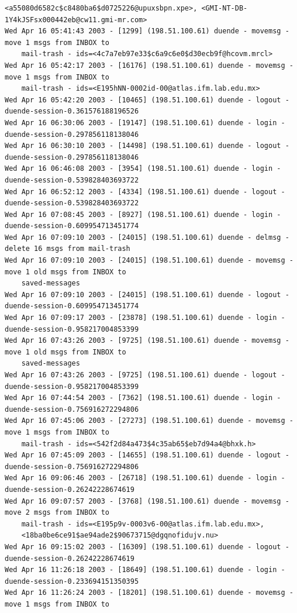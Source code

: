 \begin{lstlisting}[style=terminal]
    <a55080d6582c$c8480ba6$d0725226@upuxsbpn.xpe>, <GMI-NT-DB-1Y4kJSFsx000442eb@cw11.gmi-mr.com>
Wed Apr 16 05:41:43 2003 - [1299] (198.51.100.61) duende - movemsg - move 1 msgs from INBOX to 
    mail-trash - ids=<4c7a7eb97e33$c6a9c6e0$d30ecb9f@hcovm.mrcl>
Wed Apr 16 05:42:17 2003 - [16176] (198.51.100.61) duende - movemsg - move 1 msgs from INBOX to 
    mail-trash - ids=<E195hNN-0002id-00@atlas.ifm.lab.edu.mx>
Wed Apr 16 05:42:20 2003 - [10465] (198.51.100.61) duende - logout - duende-session-0.361576188196526
Wed Apr 16 06:30:06 2003 - [19147] (198.51.100.61) duende - login - duende-session-0.297856118138046
Wed Apr 16 06:30:10 2003 - [14498] (198.51.100.61) duende - logout - duende-session-0.297856118138046
Wed Apr 16 06:46:08 2003 - [3954] (198.51.100.61) duende - login - duende-session-0.539828403693722
Wed Apr 16 06:52:12 2003 - [4334] (198.51.100.61) duende - logout - duende-session-0.539828403693722
Wed Apr 16 07:08:45 2003 - [8927] (198.51.100.61) duende - login - duende-session-0.609954713451774
Wed Apr 16 07:09:10 2003 - [24015] (198.51.100.61) duende - delmsg - delete 16 msgs from mail-trash
Wed Apr 16 07:09:10 2003 - [24015] (198.51.100.61) duende - movemsg - move 1 old msgs from INBOX to 
    saved-messages
Wed Apr 16 07:09:10 2003 - [24015] (198.51.100.61) duende - logout - duende-session-0.609954713451774
Wed Apr 16 07:09:17 2003 - [23878] (198.51.100.61) duende - login - duende-session-0.958217004853399
Wed Apr 16 07:43:26 2003 - [9725] (198.51.100.61) duende - movemsg - move 1 old msgs from INBOX to 
    saved-messages
Wed Apr 16 07:43:26 2003 - [9725] (198.51.100.61) duende - logout - duende-session-0.958217004853399
Wed Apr 16 07:44:54 2003 - [7362] (198.51.100.61) duende - login - duende-session-0.756916272294806
Wed Apr 16 07:45:06 2003 - [27273] (198.51.100.61) duende - movemsg - move 1 msgs from INBOX to 
    mail-trash - ids=<542f2d84a473$4c35ab65$eb7d94a4@bhxk.h>
Wed Apr 16 07:45:09 2003 - [14655] (198.51.100.61) duende - logout - duende-session-0.756916272294806
Wed Apr 16 09:06:46 2003 - [26718] (198.51.100.61) duende - login - duende-session-0.26242228674619
Wed Apr 16 09:07:57 2003 - [3768] (198.51.100.61) duende - movemsg - move 2 msgs from INBOX to 
    mail-trash - ids=<E195p9v-0003v6-00@atlas.ifm.lab.edu.mx>, 
    <18ba0be6ce91$ae94ade2$90673715@dgqnofidujv.nu>
Wed Apr 16 09:15:02 2003 - [16309] (198.51.100.61) duende - logout - duende-session-0.26242228674619
Wed Apr 16 11:26:18 2003 - [18649] (198.51.100.61) duende - login - duende-session-0.233694151350395
Wed Apr 16 11:26:24 2003 - [18201] (198.51.100.61) duende - movemsg - move 1 msgs from INBOX to 

\end{lstlisting}
